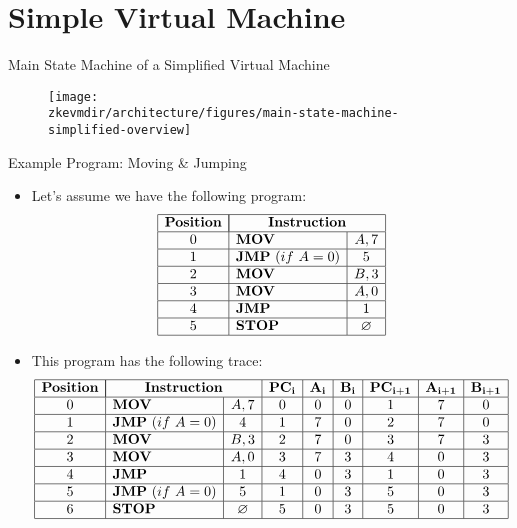 
\section{Simple Virtual Machine}

\begin{frame}{Main State Machine of a Simplified Virtual Machine}
\begin{figure}
	\texttt{[image: \\zkevmdir/architecture/figures/main-state-machine-simplified-overview]}
\end{figure}
\end{frame}









\begin{frame}[allowframebreaks]{Example Program: Moving \& Jumping}
\begin{itemize}
\item Let's assume we have the following program:
\[
\begin{array}{|c|l|c|}
\hline
\mathbf{Position} & \multicolumn{2}{|c|}{\mathbf{Instruction}} \\ \hline
0 & \mathbf{MOV} & A, 7 \\ \hline
1 & \mathbf{JMP}~(if~A = 0) & 5 \\ \hline
2 & \mathbf{MOV} & B, 3 \\ \hline
3 & \mathbf{MOV} & A, 0 \\ \hline
4 & \mathbf{JMP} & 1 \\ \hline
5 & \mathbf{STOP} & \emptyset \\ \hline
\end{array}
\]

\item This program has the following trace:
\[
\begin{array}{|c|l|c|c|c|c|c|c|c|}
\hline
\mathbf{Position} & \multicolumn{2}{|c|}{\mathbf{Instruction}} & \mathbf{PC_i} & \mathbf{A_i} & \mathbf{B_i} & \mathbf{PC_{i+1}} & \mathbf{A_{i+1}} & \mathbf{B_{i+1}} \\ \hline
0 & \mathbf{MOV} & A, 7 & 0 & 0 & 0 & 1 & 7 & 0 \\ \hline
1 & \mathbf{JMP}~(if~A = 0) & 4 & 1 & 7 & 0 & 2 & 7 & 0 \\ \hline
2 & \mathbf{MOV} & B, 3 & 2 & 7 & 0 & 3 & 7 & 3 \\ \hline
3 & \mathbf{MOV} & A, 0 & 3 & 7 & 3 & 4 & 0 & 3 \\ \hline
4 & \mathbf{JMP} & 1 & 4 & 0 & 3 & 1 & 0 & 3 \\ \hline
5 & \mathbf{JMP}~(if~A = 0) & 5 & 1 & 0 & 3 & 5 & 0 & 3 \\ \hline
6 & \mathbf{STOP} & \emptyset & 5 & 0 & 3 & 5 & 0 & 3 \\ \hline
\end{array}
\]
\end{itemize}
\end{frame}






